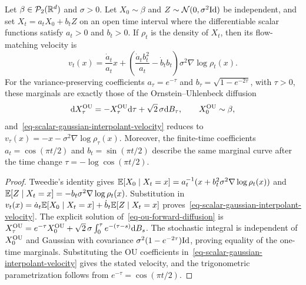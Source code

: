 \begin{prop}\label{prop-static-ou-equivalence}
	Let $\beta\in\mathcal{P}_2(\mathbb{R}^d)$ and $\sigma>0$. Let $X_0\sim\beta$ and $Z\sim\mathcal{N}(0,\sigma^2\mathrm{Id})$ be independent, and set $X_t=a_tX_0+b_tZ$ on an open time interval where the differentiable scalar functions satisfy $a_t>0$ and $b_t>0$. If $\rho_t$ is the density of $X_t$, then its flow-matching velocity is
	\begin{equation}\label{eq-scalar-gaussian-interpolant-velocity}
		v_t(x)=\frac{\dot a_t}{a_t}x+
		\left(\frac{\dot a_t b_t^2}{a_t}-\dot b_t b_t\right)\sigma^2\nabla\log \rho_t(x).
	\end{equation}
	For the variance-preserving coefficients $a_\tau=e^{-\tau}$ and $b_\tau=\sqrt{1-e^{-2\tau}}$, with $\tau>0$, these marginals are exactly those of the Ornstein--Uhlenbeck diffusion
	\begin{equation}\label{eq-ou-forward-diffusion}
		\mathrm{d} X_\tau^{\rm OU}=-X_\tau^{\rm OU}\mathrm{d}\tau+\sqrt{2}\,\sigma\mathrm{d} B_\tau,
		\qquad X_0^{\rm OU}\sim\beta,
	\end{equation}
	and~\eqref{eq-scalar-gaussian-interpolant-velocity} reduces to $v_\tau(x)=-x-\sigma^2\nabla\log \rho_\tau(x)$. Moreover, the finite-time coefficients $a_t=\cos(\pi t/2)$ and $b_t=\sin(\pi t/2)$ describe the same marginal curve after the time change $\tau=-\log\cos(\pi t/2)$.
\end{prop}

\begin{proof}
	Tweedie's identity gives $\mathbb{E}[X_0\mid X_t=x]=a_t^{-1}(x+b_t^2\sigma^2\nabla\log \rho_t(x))$ and $\mathbb{E}[Z\mid X_t=x]=-b_t\sigma^2\nabla\log \rho_t(x)$. Substitution in $v_t(x)=\dot a_t\mathbb{E}[X_0\mid X_t=x]+\dot b_t\mathbb{E}[Z\mid X_t=x]$ proves~\eqref{eq-scalar-gaussian-interpolant-velocity}. The explicit solution of~\eqref{eq-ou-forward-diffusion} is $X_\tau^{\rm OU}=e^{-\tau}X_0^{\rm OU}+\sqrt{2}\,\sigma\int_0^\tau e^{-(\tau-s)}\mathrm{d} B_s$. The stochastic integral is independent of $X_0^{\rm OU}$ and Gaussian with covariance $\sigma^2(1-e^{-2\tau})\mathrm{Id}$, proving equality of the one-time marginals. Substituting the OU coefficients in~\eqref{eq-scalar-gaussian-interpolant-velocity} gives the stated velocity, and the trigonometric parametrization follows from $e^{-\tau}=\cos(\pi t/2)$.
\end{proof}

